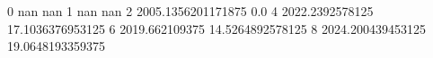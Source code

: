 0 nan nan
1 nan nan
2 2005.1356201171875 0.0
4 2022.2392578125 17.1036376953125
6 2019.662109375 14.5264892578125
8 2024.200439453125 19.0648193359375
